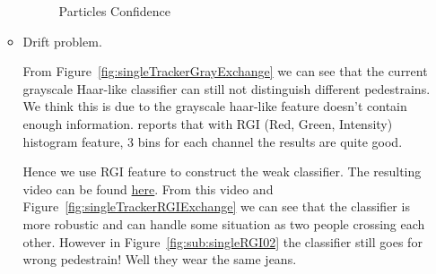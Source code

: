 \documentclass[a4paper]{article}
\begin{document}
\begin{enumerate}
\begin{itemize}
\begin{figure}[htb]
    \begin{center}
    \end{center}
    \caption{Particles Confidence}
    \label{fig:particlesConfidence}
\end{figure}

\item Drift problem.

From Figure~\ref{fig:singleTrackerGrayExchange} we can see that the current grayscale Haar-like classifier can still not distinguish different pedestrains. We think this is due to the grayscale haar-like feature doesn't contain enough information. \cite{eth_biwi_00633} reports that with RGI (Red, Green, Intensity) histogram feature, 3 bins for each channel the results are quite good. 

Hence we use RGI feature to construct the weak classifier. The resulting video can be found \href{https://zerowong.github.io/PedestrainCounting/results/singleTrackerTestRGI01.avi}{here}. From this video and Figure~\ref{fig:singleTrackerRGIExchange} we can see that the classifier is more robustic and can handle some situation as two people crossing each other. However in Figure~\ref{fig:sub:singleRGI02} the classifier still goes for wrong pedestrain! Well they wear the same jeans.


\end{itemize}
\end{enumerate}
\end{document}
